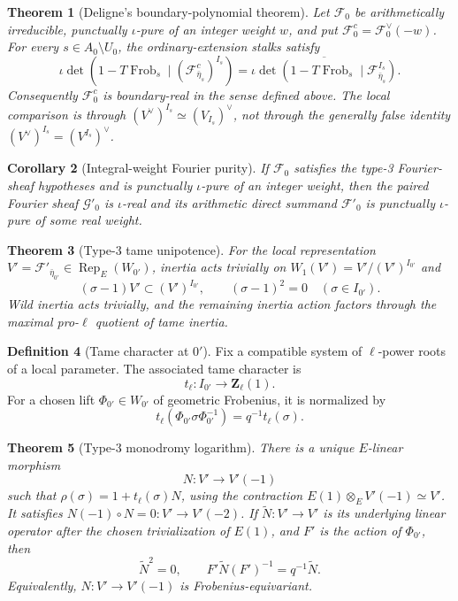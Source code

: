 \documentclass[10pt]{article}
\newtheorem{theorem}{Theorem}[section]
\newtheorem{corollary}[theorem]{Corollary}
\theoremstyle{definition}
\newtheorem{definition}[theorem]{Definition}
\newcommand{\Rep}{\operatorname{Rep}}
\newcommand{\Frob}{\operatorname{Frob}}
\begin{document}
\begin{theorem}[Deligne's boundary-polynomial theorem]
Let \(\mathcal F_0\) be arithmetically irreducible, punctually
\(\iota\)-pure of an integer weight \(w\), and put
\(\mathcal F_0^c=\mathcal F_0^\vee(-w)\).  For every
\(s\in A_0\setminus U_0\), the ordinary-extension stalks satisfy
\[
 \iota\det\!\left(1-T\Frob_s\mid
       (\mathcal F^c_{\bar\eta_s})^{I_s}\right)
 =
 \overline{\iota\det\!\left(1-T\Frob_s\mid
       \mathcal F_{\bar\eta_s}^{I_s}\right)}.
\]
Consequently \(\mathcal F_0^c\) is boundary-real in the sense defined
above.  The local comparison is through
\((V^\vee)^{I_s}\simeq(V_{I_s})^\vee\), not through the generally false
identity \((V^\vee)^{I_s}=(V^{I_s})^\vee\).
\end{theorem}

\begin{corollary}[Integral-weight Fourier purity]
If \(\mathcal F_0\) satisfies the type-3 Fourier-sheaf hypotheses and is
punctually \(\iota\)-pure of an integer weight, then the paired Fourier
sheaf \(\mathcal G'_0\) is \(\iota\)-real and its arithmetic direct summand
\(\mathcal F'_0\) is punctually \(\iota\)-pure of some real weight.
\end{corollary}

\begin{theorem}[Type-3 tame unipotence]
For the local representation
\(V'=\mathcal F'_{\bar\eta_{0'}}\in\Rep_E(W_{0'})\), inertia acts
trivially on \(W_1(V')=V'/(V')^{I_{0'}}\) and
\[
 (\sigma-1)V'\subset(V')^{I_{0'}},\qquad
 (\sigma-1)^2=0\quad(\sigma\in I_{0'}).
\]
Wild inertia acts trivially, and the remaining inertia action factors
through the maximal pro-\(\ell\) quotient of tame inertia.
\end{theorem}

\begin{definition}[Tame character at \(0'\)]
Fix a compatible system of \(\ell\)-power roots of a local parameter.  The
associated tame character is
\[
 t_\ell:I_{0'}\longrightarrow\mathbf Z_\ell(1).
\]
For a chosen lift \(\Phi_{0'}\in W_{0'}\) of geometric Frobenius, it is
normalized by
\[
 t_\ell(\Phi_{0'}\sigma\Phi_{0'}^{-1})
       =q^{-1}t_\ell(\sigma).
\]
\end{definition}

\begin{theorem}[Type-3 monodromy logarithm]
There is a unique \(E\)-linear morphism
\[
 N:V'\longrightarrow V'(-1)
\]
such that \(\rho(\sigma)=1+t_\ell(\sigma)N\), using the contraction
\(E(1)\otimes_EV'(-1)\simeq V'\).  It satisfies
\(N(-1)\circ N=0:V'\to V'(-2)\).  If \(\widetilde N:V'\to V'\) is its
underlying linear operator after the chosen trivialization of \(E(1)\), and
\(F'\) is the action of \(\Phi_{0'}\), then
\[
 \widetilde N^2=0,\qquad
 F'\widetilde N(F')^{-1}=q^{-1}\widetilde N.
\]
Equivalently, \(N:V'\to V'(-1)\) is Frobenius-equivariant.
\end{theorem}
\end{document}
